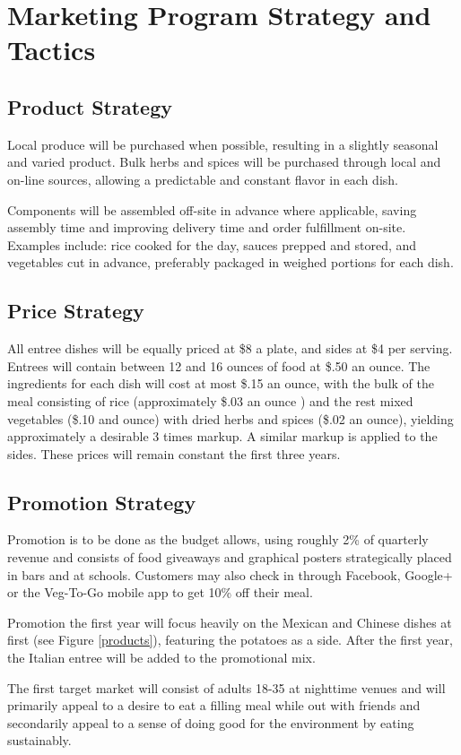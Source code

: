 \documentclass[12pt, letterpaper]{article}
\begin{document}
\section{Marketing Program Strategy and Tactics}
\subsection{Product Strategy}
Local produce will be purchased when possible, resulting in a slightly seasonal and varied product. Bulk herbs and spices will be purchased through local and on-line sources, allowing a predictable and constant flavor in each dish.

Components will be assembled off-site in advance where applicable, saving assembly time and improving delivery time and order fulfillment on-site. Examples include: rice cooked for the day, sauces prepped and stored, and vegetables cut in advance, preferably packaged in weighed portions for each dish.
\subsection{Price Strategy}
All entree dishes will be equally priced at \$8 a plate, and sides at \$4 per serving. Entrees will contain between 12 and 16 ounces of food at \$.50 an ounce. The ingredients for each dish will cost at most \$.15 an ounce, with the bulk of the meal consisting of rice (approximately \$.03 an ounce \cite{costs}) and the rest mixed vegetables (\$.10 and ounce) with dried herbs and spices (\$.02 an ounce), yielding approximately a desirable 3 times markup. A similar markup is applied to the sides.  These prices will remain constant the first three years.
\subsection{Promotion Strategy}
Promotion is to be done as the budget allows, using roughly 2\% of quarterly revenue and consists of food giveaways and graphical posters strategically placed in bars and at schools.  Customers may also check in through Facebook, Google+ or the Veg-To-Go mobile app to get 10\% off their meal.

Promotion the first year will focus heavily on the Mexican and Chinese dishes at first (see Figure \ref{products}), featuring the potatoes as a side. After the first year, the Italian entree will be added to the promotional mix.

The first target market will consist of adults 18-35 at nighttime venues and will primarily appeal to a desire to eat a filling meal while out with friends and secondarily appeal to a sense of doing good for the environment by eating sustainably.
\end{document}
